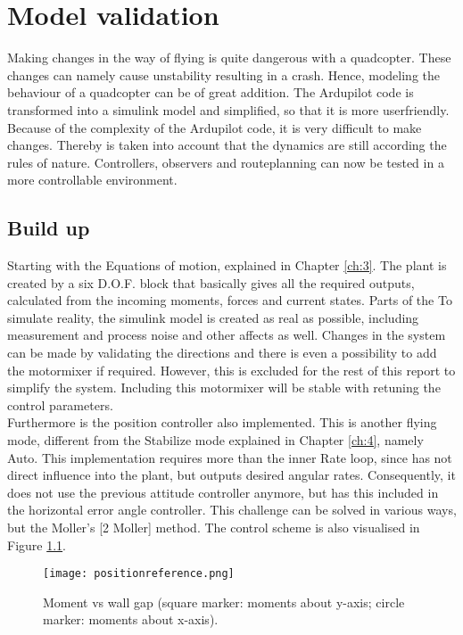 \chapter{Model validation} \label{ch:6}
Making changes in the way of flying is quite dangerous with a quadcopter. These changes can namely cause unstability resulting in a crash. Hence, modeling the behaviour of a quadcopter can be of great addition. The Ardupilot code is transformed into a simulink model and simplified, so that it is more userfriendly. Because of the complexity of the Ardupilot code, it is very difficult to make changes. Thereby is taken into account that the dynamics are still according the rules of nature. Controllers, observers and routeplanning can now be tested in a more controllable environment. \\

\section{Build up}
Starting with the Equations of motion, explained in Chapter \ref{ch:3}. The plant is created by a six D.O.F. block that basically gives all the required outputs, calculated from the incoming moments, forces and current states. Parts of the 
To simulate reality, the simulink model is created as real as possible, including measurement and process noise and other affects as well. Changes in the system can be made by validating the directions and there is even a possibility to add the motormixer if required. However, this is excluded for the rest of this report to simplify the system. Including this motormixer will be stable with retuning the control parameters.\\

Furthermore is the position controller also implemented. This is another flying mode, different from the Stabilize mode explained in Chapter \ref{ch:4}, namely Auto. This implementation requires more than the inner Rate loop, since has not direct influence into the plant, but outputs desired angular rates. Consequently, it does not use the previous attitude controller anymore, but has this included in the horizontal error angle controller. This challenge can be solved in various ways, but the Moller's [2 Moller] method. The control scheme is also visualised in Figure \ref{fig:positionreference}. 

\begin{figure}[H]
\centering
\texttt{[image: positionreference.png]}
\caption{Moment vs wall gap (square marker: moments about y-axis; circle marker: moments about x-axis).}
\label{fig:positionreference}
\end{figure}

